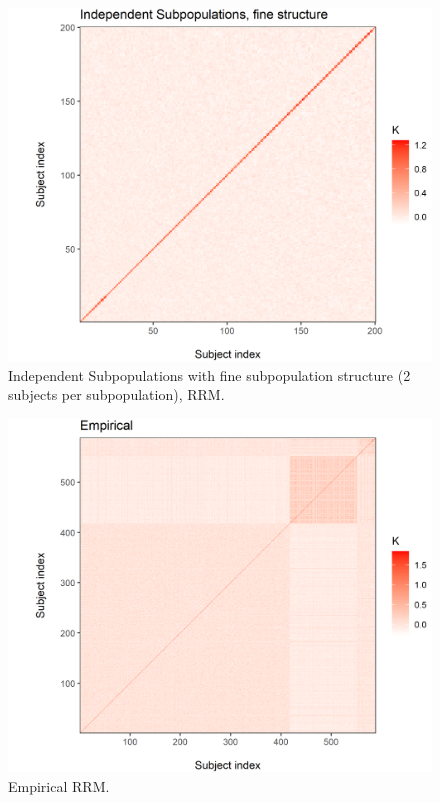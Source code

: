 \begin{figure}[H]
    \centering
    \includegraphics[scale = 1]{figures/indep_fine_kinship.png}
    \caption{Independent Subpopulations with fine subpopulation structure (2 subjects per subpopulation), RRM.}
    \label{fig:indep_fine}
\end{figure}

\begin{figure}[H]
    \centering
    \includegraphics[scale = 1]{figures/empirical_kinship.png}
    \caption{Empirical RRM.}
    \label{fig:empirical}
\end{figure}

